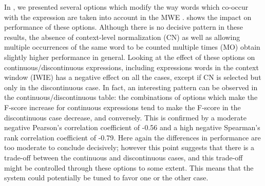 \documentclass[output=paper
,modfonts
,nonflat]{langsci/langscibook}
\begin{document}
In , we presented several options
which modify the way words which co-occur with the expression are
taken into account in the MWE . 
 shows the impact on performance of these
options. Although there is no decisive pattern in these results, the
absence of context-level normalization (CN) as well as allowing
multiple occurrences of the same word to be counted multiple times
(MO) obtain slightly higher performance in general. Looking at the
effect of these options on continuous/discontinuous expressions,
including expressions words in the context window (IWIE) has a
negative effect on all the cases, except if CN is selected but only in
the discontinuous case. In fact, an interesting pattern can be
observed in the continuous/discontinuous table: the combinations of
options which make the F-score increase for continuous expressions
tend to make the F-score in the discontinuous case decrease, and
conversely. This is confirmed by a moderate negative Pearson's
correlation coefficient of -0.56 and a high negative Spearman's rank
correlation coefficient of -0.79. Here again the differences in
performance are too moderate to conclude decisively; however this
point suggests that there is a trade-off between the continuous and
discontinuous cases, and this trade-off might be controlled through
these options to some extent. This means that the system could
potentially be tuned to favor one or the other case.


%
%





\end{document}
